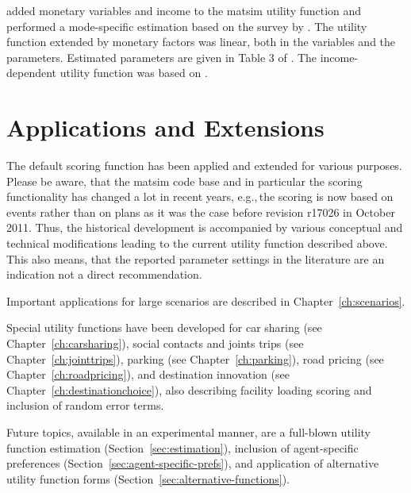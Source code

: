 \citet[][]{Kickhoefer_MastersThesis_2009} added monetary variables and income to the \gls{matsim} utility function and performed a mode-specific estimation based on the survey by \citet[][]{VrticEtAl_ResRep_SVI_2007}. The utility function extended by monetary factors was linear, both in the variables and the parameters. Estimated parameters are given in Table 3 of \citet[][]{Kickhoefer_MastersThesis_2009}. The income-dependent utility function was based on \citet[][]{Franklin_PhDThesis_2006}.

%

\section{Applications and Extensions}
\label{sec:appsExtensions}
The default scoring function has been applied and extended for various purposes. Please be aware, that the \gls{matsim} code base and in particular the scoring functionality has changed a lot in recent years, e.g.,\,the scoring is now based on events rather than on plans as it was the case before revision r17026 in October 2011.
Thus, the historical development is accompanied by various conceptual and technical modifications leading to the current utility function described above. This also means, that the reported parameter settings in the literature are an indication not a direct recommendation.

Important applications for large scenarios are described in Chapter~\ref{ch:scenarios}.

Special utility functions have been developed for car sharing (see Chapter~\ref{ch:carsharing}), social contacts and joints trips (see Chapter~\ref{ch:jointtrips}), parking (see Chapter~\ref{ch:parking}), road pricing (see Chapter~\ref{ch:roadpricing}), and destination innovation (see Chapter~\ref{ch:destinationchoice}), also describing facility loading scoring and inclusion of random error terms. 
 
Future topics, available in an experimental manner, are a full-blown utility function estimation (Section~\ref{sec:estimation}), inclusion of agent-specific preferences (Section~\ref{sec:agent-specific-prefs}), and application of alternative utility function forms (Section~\ref{sec:alternative-functions}).

